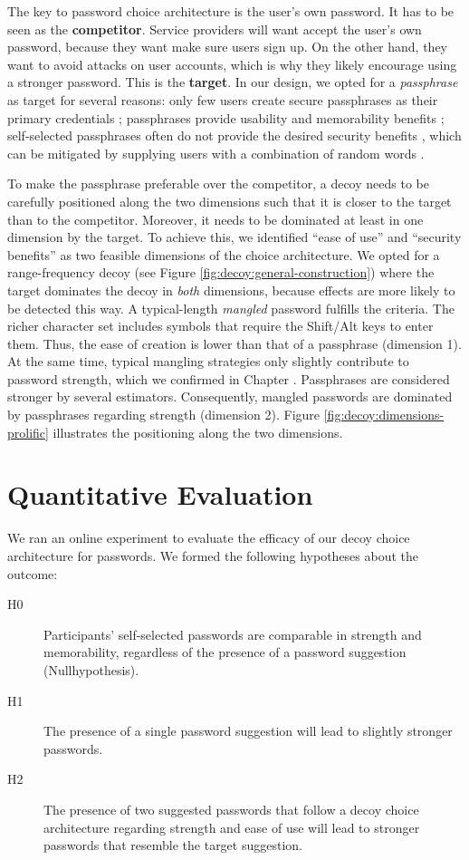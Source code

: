 The key to password choice architecture is the user's own password. It has to be seen as the \textbf{competitor}. Service providers will want accept the user's own password, because they want make sure users sign up. On the other hand, they want to avoid attacks on user accounts, which is why they likely encourage using a stronger password. This is the \textbf{target}. In our design, we opted for a \textit{passphrase} as target for several reasons: only few users create secure passphrases as their primary credentials \cite{Ur2015PWCreationLab}; passphrases provide usability and memorability benefits \cite{Keith2009PassphraseDesign}; self-selected passphrases often do not provide the desired security benefits \cite{Bonneau2012LinguisticProperties}, which can be mitigated by supplying users with a combination of random words \cite{Shay2012CorrectHorseBatteryStaple}. 

To make the passphrase preferable over the competitor, a decoy needs to be carefully positioned along the two dimensions such that it is closer to the target than to the competitor. Moreover, it needs to be dominated at least in one dimension by the target. To achieve this, we identified ``ease of use'' and ``security benefits'' as two feasible dimensions of the choice architecture. We opted for a range-frequency decoy (see Figure \ref{fig:decoy:general-construction}) where the target dominates the decoy in \textit{both} dimensions, because effects are more likely to be detected this way. A typical-length \textit{mangled} password fulfills the criteria. The richer character set includes symbols that require the Shift/Alt keys to enter them. Thus, the ease of creation is lower than that of a passphrase (dimension 1). At the same time, typical mangling strategies only slightly contribute to password strength, which we confirmed in Chapter \cite{chap:pasdjo}. Passphrases are considered stronger by several estimators. Consequently, mangled passwords are dominated by passphrases regarding strength (dimension 2). Figure \ref{fig:decoy:dimensions-prolific} illustrates the positioning along the two dimensions.

\section{Quantitative Evaluation}
We ran an online experiment to evaluate the efficacy of our decoy choice architecture for passwords. We formed the following hypotheses about the outcome:
\begin{description}
	\item[H0] Participants' self-selected passwords are comparable in strength and memorability, regardless of the presence of a password suggestion (Nullhypothesis). 
	\item[H1] The presence of a single password suggestion will lead to slightly stronger passwords.
	\item[H2] The presence of two suggested passwords that follow a decoy choice architecture regarding strength and ease of use will lead to stronger passwords that resemble the target suggestion. 
\end{description}

